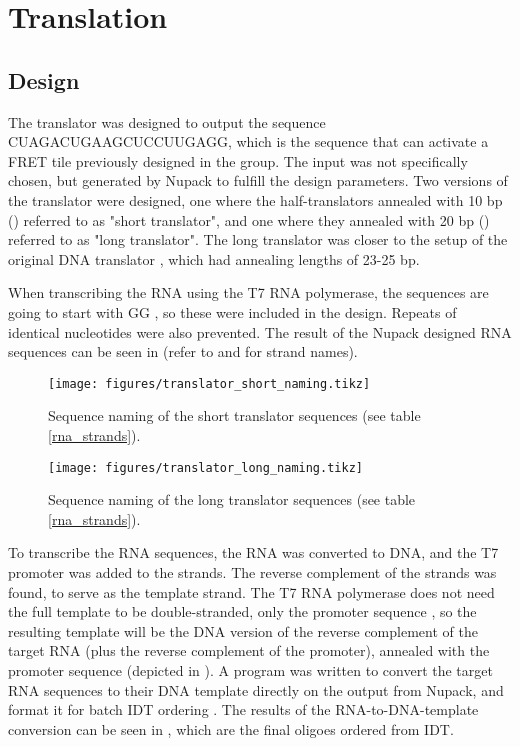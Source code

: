 \section{Translation}
\subsection{Design}
The translator was designed to output the sequence CUAGACUGAAGCUCCUUGAGG, which is the sequence that can activate a FRET tile previously designed in the group. The input was not specifically chosen, but generated by Nupack to fulfill the design parameters. Two versions of the translator were designed, one where the half-translators annealed with 10 bp () referred to as "short translator", and one where they annealed with 20 bp () referred to as "long translator". The long translator was closer to the setup of the original DNA translator \cite{Picuri2009}, which had annealing lengths of 23-25 bp.

When transcribing the RNA using the T7 RNA polymerase, the sequences are going to start with GG \cite{Milligan1987}, so these were included in the design. Repeats of identical nucleotides were also prevented. The result of the Nupack designed RNA sequences can be seen in  (refer to  and  for strand names).

\begin{figure}[h]
\centering
\texttt{[image: figures/translator\_short\_naming.tikz]}
\caption{Sequence naming of the short translator sequences (see table \ref{rna_strands}).}
\label{translator_short_subunits}
\end{figure}


\begin{figure}[h]
\centering
\texttt{[image: figures/translator\_long\_naming.tikz]}
\caption{Sequence naming of the long translator sequences (see table \ref{rna_strands}).}
\label{translator_long_subunits}
\end{figure}

To transcribe the RNA sequences, the RNA was converted to DNA, and the T7 promoter was added to the strands. The reverse complement of the strands was found, to serve as the template strand. The T7 RNA polymerase does not need the full template to be double-stranded, only the promoter sequence \cite{Milligan1987}, so the resulting template will be the DNA version of the reverse complement of the target RNA (plus the reverse complement of the promoter), annealed with the promoter sequence (depicted in ). A program was written to convert the target RNA sequences to their DNA template directly on the output from Nupack, and format it for batch IDT ordering \cite{nupackorder}. The results of the RNA-to-DNA-template conversion can be seen in , which are the final oligoes ordered from IDT.

